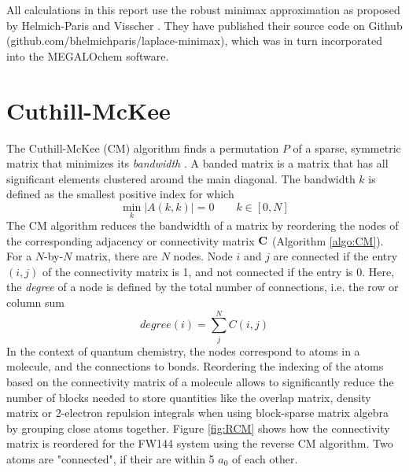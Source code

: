 All calculations in this report use the robust minimax approximation as proposed by Helmich-Paris and Visscher \cite{Hel2016}. They have published their source code on Github (github.com/bhelmichparis/laplace-minimax), which was in turn incorporated into the MEGALOchem software.

\section{Cuthill-McKee}

The Cuthill-McKee (CM) algorithm finds a permutation $P$ of a sparse, symmetric matrix that minimizes its \emph{bandwidth} \cite{Cut1969}. A banded matrix is a matrix that has all significant elements clustered around the main diagonal. The bandwidth $k$ is defined as the smallest positive index for which
\begin{equation}
\min_k \left\lvert A(k,k) \right\rvert = 0 \qquad k \in [0,N]
\end{equation}
\noindent The CM algorithm reduces the bandwidth of a matrix by reordering the nodes of the corresponding adjacency or connectivity matrix $\mathbf{C}$ (Algorithm \ref{algo:CM}). For a $N$-by-$N$ matrix, there are $N$ nodes. Node $i$ and $j$ are connected if the entry $(i,j)$ of the connectivity matrix is 1, and not connected if the entry is 0. Here, the \emph{degree} of a node is defined by the total number of connections, i.e. the row or column sum
\begin{equation}
degree(i) = \sum_j^N C(i,j)
\end{equation}
In the context of quantum chemistry, the nodes correspond to atoms in a molecule, and the connections to bonds. Reordering the indexing of the atoms based on the connectivity matrix of a molecule allows to significantly reduce the number of blocks needed to store quantities like the overlap matrix, density matrix or 2-electron repulsion integrals when using block-sparse matrix algebra by grouping close atoms together. Figure \ref{fig:RCM} shows how the connectivity matrix is reordered for the FW144 system using the reverse CM algorithm. Two atoms are "connected", if their are within 5 $a_0$ of each other.

